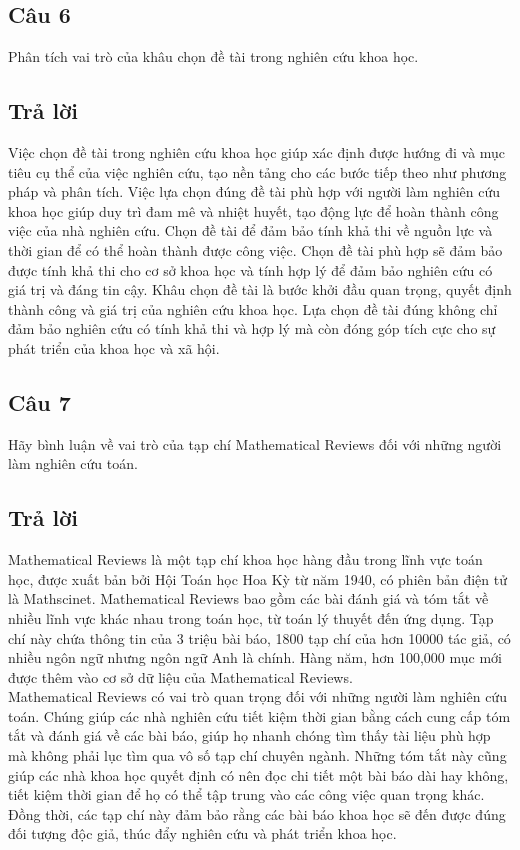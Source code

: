 \subsection*{Câu 6} Phân tích vai trò của khâu chọn đề tài trong nghiên cứu khoa
học.
\subsection*{Trả lời}
Việc chọn đề tài trong nghiên cứu khoa học giúp xác định được hướng đi và mục tiêu cụ thể của việc nghiên cứu, tạo nền tảng cho các bước tiếp theo như phương pháp và phân tích.
Việc lựa chọn đúng đề tài phù hợp với người làm nghiên cứu khoa học giúp duy trì đam mê và nhiệt huyết, tạo động lực để hoàn thành công việc của nhà nghiên cứu.
Chọn đề tài để đảm bảo tính khả thi về nguồn lực và thời gian để có thể hoàn thành được công việc.
Chọn đề tài phù hợp sẽ đảm bảo được tính khả thi cho cơ sở khoa học và tính hợp lý để đảm bảo nghiên cứu có giá trị và đáng tin cậy. 
Khâu chọn đề tài là bước khởi đầu quan trọng, quyết định thành công và giá trị của nghiên cứu khoa học. Lựa chọn đề tài đúng không chỉ đảm bảo nghiên cứu có tính khả thi và hợp lý mà còn đóng góp tích cực cho sự phát triển của khoa học và xã hội.
\subsection*{Câu 7} 
Hãy bình luận về vai trò của tạp chí Mathematical Reviews
đối với những người làm nghiên cứu toán.
\subsection*{Trả lời}
Mathematical Reviews là một tạp chí khoa học hàng đầu trong lĩnh vực toán học, được xuất bản bởi Hội Toán học Hoa Kỳ từ năm 1940,  có phiên bản điện tử là Mathscinet.
Mathematical Reviews bao gồm các bài đánh giá và tóm tắt về nhiều lĩnh vực khác nhau trong toán học, từ toán lý thuyết đến ứng dụng.
Tạp chí này chứa thông tin của 3 triệu bài báo, 1800 tạp chí của hơn 10000 tác giả, có nhiều ngôn ngữ nhưng ngôn ngữ Anh là chính.
Hàng năm, hơn 100,000 mục mới được thêm vào cơ sở dữ liệu của Mathematical Reviews.\\
Mathematical Reviews có vai trò quan trọng đối với những người làm nghiên cứu toán. Chúng giúp các nhà nghiên cứu tiết kiệm thời gian bằng cách cung cấp tóm tắt và đánh giá về các bài báo, giúp họ nhanh chóng tìm thấy tài liệu phù hợp mà không phải lục tìm qua vô số tạp chí chuyên ngành. Những tóm tắt này cũng giúp các nhà khoa học quyết định có nên đọc chi tiết một bài báo dài hay không, tiết kiệm thời gian để họ có thể tập trung vào các công việc quan trọng khác. Đồng thời, các tạp chí này đảm bảo rằng các bài báo khoa học sẽ đến được đúng đối tượng độc giả, thúc đẩy nghiên cứu và phát triển khoa học.
